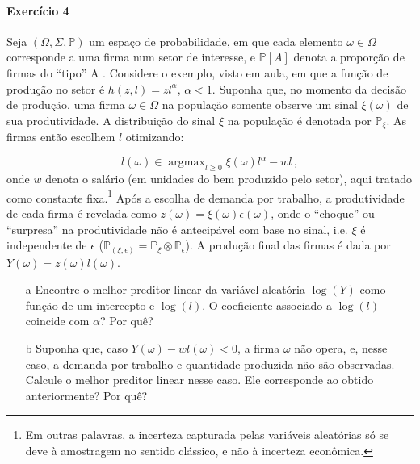 \documentclass[10pt,a4paper]{article}
\begin{document}
 \paragraph{Exercício 4} Seja $(\Omega, \Sigma,\mathbb{P})$ um espaço de probabilidade, em que cada elemento $\omega \in \Omega$ corresponde a uma firma num setor de interesse, e $\mathbb{P}[A]$ denota a proporção de firmas do ``tipo'' A . Considere o exemplo, visto em aula, em que a função de produção no setor é $h(z,l) = zl^{\alpha}$, $\alpha < 1$. Suponha que, no momento da decisão de produção, uma firma $\omega \in \Omega$ na população somente observe um sinal $\xi(\omega)$ de sua produtividade. A distribuição do sinal $\xi$ na população é denotada por $\mathbb{P}_\xi$. As firmas então escolhem $l$ otimizando:
 
 $$l(\omega) \in \operatorname{argmax}_{l \geq 0} \xi(\omega) l^{\alpha}- w l\, ,$$
onde $w$ denota o salário (em unidades do bem produzido pelo setor), aqui tratado como constante fixa.\footnote{Em outras palavras, a incerteza capturada pelas variáveis aleatórias só se deve à amostragem no sentido clássico, e não à incerteza econômica.} Após a escolha de demanda por trabalho, a produtividade de cada firma é revelada como $z(\omega) = \xi(\omega)\epsilon(\omega)$, onde o ``choque'' ou ``surpresa'' na produtividade  não é antecipável com base no sinal, i.e. $\xi$ é independente de $\epsilon$  ($\mathbb{P}_{(\xi,\epsilon)}  = \mathbb{P}_{\xi}\otimes \mathbb{P}_{\epsilon}$). A produção final das firmas é dada por $Y(\omega) = z(\omega) l(\omega)$.

\begin{itemize}
	\item[a] Encontre o melhor preditor linear da variável aleatória $\log(Y)$ como função de um intercepto e $\log(l)$. O coeficiente associado a $\log(l)$ coincide com $\alpha$? Por quê?
	\item[b] Suponha que, caso $Y(\omega) - wl(\omega)<0$, a firma $\omega$ não opera, e, nesse caso, a demanda por trabalho e quantidade produzida não são observadas. Calcule o melhor preditor linear nesse caso. Ele corresponde ao obtido anteriormente? Por quê?
\end{itemize}


 
\end{document}
